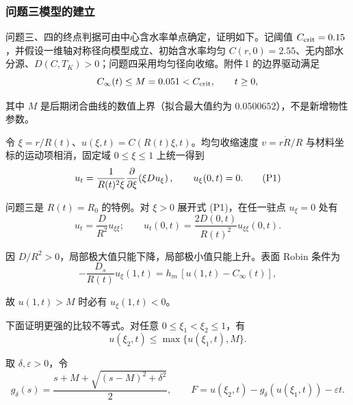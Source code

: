 \begingroup
\small
\setlength{\parskip}{0pt}
\setlength{\parindent}{2em}
\linespread{1.03}\selectfont
\setlength{\abovedisplayskip}{3pt}
\setlength{\belowdisplayskip}{3pt}

\subsubsection{问题三模型的建立}

\indent 问题三、四的终点判据可由中心含水率单点确定，证明如下。记阈值 $C_{\rm crit}=0.15$，并假设一维轴对称径向模型成立、初始含水率均匀 $C(r,0)=2.55$、无内部水分源、$D(C,T_K)>0$；问题四采用均匀径向收缩。附件\,1 的边界驱动满足
\begin{equation*}
 C_\infty(t)\le M=0.051<C_{\rm crit},\qquad t\ge0,
\end{equation*}

\indent 其中 $M$ 是后期闭合曲线的数值上界（拟合最大值约为 $0.0500652$），不是新增物性参数。

\indent 令 $\xi=r/R(t)$、$u(\xi,t)=C(R(t)\xi,t)$。均匀收缩速度 $v=r\dot R/R$ 与材料坐标的运动项相消，固定域 $0\le\xi\le1$ 上统一得到
\begin{equation*}
 u_t=\frac{1}{R(t)^2\xi}\frac{\partial}{\partial\xi}\!\left(\xi D u_\xi\right),\qquad u_\xi(0,t)=0.
 \tag{P1}
\end{equation*}

\indent 问题三是 $R(t)=R_0$ 的特例。对 $\xi>0$ 展开式 (P1)，在任一驻点 $u_\xi=0$ 处有
\begin{equation*}
 u_t=\frac{D}{R^2}u_{\xi\xi};\qquad
 u_t(0,t)=\frac{2D(0,t)}{R(t)^2}u_{\xi\xi}(0,t).
 \tag{P2}
\end{equation*}

\indent 因 $D/R^2>0$，局部极大值只能下降，局部极小值只能上升。表面 Robin 条件为
\begin{equation*}
 -\frac{D_s}{R(t)}u_\xi(1,t)=h_m\,[u(1,t)-C_\infty(t)],
 \tag{P3}
\end{equation*}

\indent 故 $u(1,t)>M$ 时必有 $u_\xi(1,t)<0$。

\indent 下面证明更强的比较不等式。对任意 $0\le\xi_1<\xi_2\le1$，有
\begin{equation*}
 u(\xi_2,t)\le\max\{u(\xi_1,t),M\}.
 \tag{P4}
\end{equation*}

\indent 取 $\delta,\varepsilon>0$，令
\begin{equation*}
 g_\delta(s)=\frac{s+M+\sqrt{(s-M)^2+\delta^2}}2,\qquad
 F=u(\xi_2,t)-g_\delta(u(\xi_1,t))-\varepsilon t .
 \tag{P5}
\end{equation*}

